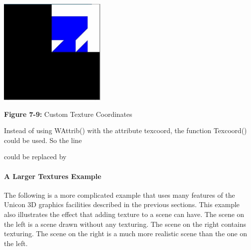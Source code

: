 \bigskip

{\centering 
\includegraphics[width=2.0307in,height=2.0311in]{ub-img/ub-img40.jpg}
\par}

{\sffamily\bfseries Figure 7-9:}
{\sffamily Custom Texture Coordinates}

\bigskip


Instead of using WAttrib() with the attribute texcoord, the function
Texcoord() could be used. So the line 


could be replaced by 


\paragraph[A Larger Textures Example]{A Larger Textures Example}
The following is a more complicated example that uses many features of
the Unicon 3D graphics facilities described in the previous sections.
This example also illustrates the effect that adding texture to a scene
can have. The scene on the left is a scene drawn without any texturing.
The scene on the right contains texturing. The scene on the right is a
much more realistic scene than the one on the left. 

